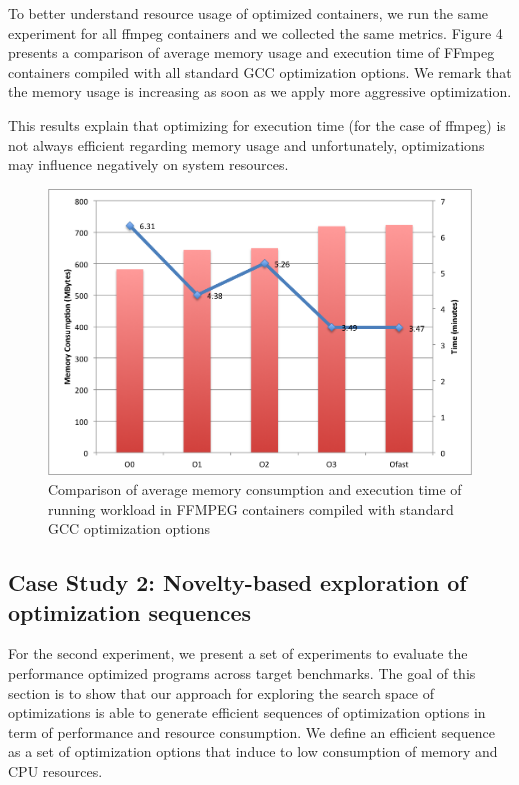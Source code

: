 To better understand resource usage of optimized containers, we run the same experiment for all ffmpeg containers and we collected the same metrics. Figure 4 presents a comparison of average memory usage and execution time of FFmpeg containers compiled with all standard GCC optimization options. We remark that the memory usage is increasing as soon as we apply more aggressive optimization.

This results explain that optimizing for execution time (for the case of ffmpeg) is not always efficient regarding memory usage and unfortunately, optimizations may influence negatively on system resources. 
\begin{figure}[h]
	\centering
	\includegraphics[scale=0.4]{Ressources/infra_ffmpeg_plot1.png}
	\caption{Comparison of average memory consumption and execution time of running workload in FFMPEG containers compiled with standard GCC optimization options}
\end{figure}






\subsection{Case Study 2: Novelty-based exploration of optimization sequences}
For the second experiment, we present a set of experiments to evaluate the performance optimized programs across target benchmarks. The goal of this section
is to show that our approach for exploring the search space of optimizations is able to generate efficient sequences of optimization options in term of performance and
resource consumption. We define an efficient sequence as a
set of optimization options that induce to low consumption of
memory and CPU resources.
